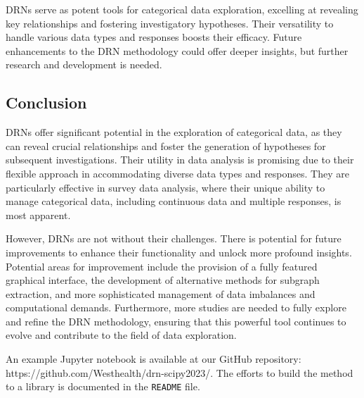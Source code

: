 DRNs serve as potent tools for categorical data exploration, excelling at revealing key relationships and fostering investigatory hypotheses. Their versatility to handle various data types and responses boosts their efficacy. Future enhancements to the DRN methodology could offer deeper insights, but further research and development is needed.

\subsection{Conclusion \label{Conclusion}}

DRNs offer significant potential in the exploration of categorical data, as they can reveal crucial relationships and foster the generation of hypotheses for subsequent investigations. Their utility in data analysis is promising due to their flexible approach in accommodating diverse data types and responses. They are particularly effective in survey data analysis, where their unique ability to manage categorical data, including continuous data and multiple responses, is most apparent.

However, DRNs are not without their challenges. There is potential for future improvements to enhance their functionality and unlock more profound insights. Potential areas for improvement include the provision of a fully featured graphical interface, the development of alternative methods for subgraph extraction, and more sophisticated management of data imbalances and computational demands. Furthermore, more studies are needed to fully explore and refine the DRN methodology, ensuring that this powerful tool continues to evolve and contribute to the field of data exploration.

An example Jupyter notebook is available at our GitHub repository: https://github.com/Westhealth/drn-scipy2023/. The efforts to build the method to a library is documented in the \texttt{README} file. 

